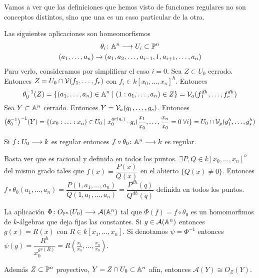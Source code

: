 \documentclass[ACGA.tex]{subfiles}
\begin{document}
\begin{prop}Vamos a ver que las definiciones que hemos visto de funciones regulares no son conceptos distintos, sino que una es un caso particular de la otra.
\end{prop}
\begin{dem}
\begin{lemma}
 Las siguientes aplicaciones son homeomorfismos
\begin{gather*} 
\theta_i \colon{\mathbb{A}^n}\longrightarrow{U_i\subset \mathbb{P}^n}\\
(a_1,\dotsc,a_n) \rightarrow (a_1,a_2,\dotsc,a_{i-1},1,a_{i+1},\dotsc,a_n)
\end{gather*}
Para verlo, consideramos por simplificar el caso $i=0$. Sea $Z\subset U_0$ cerrado. Entonces $Z=U_0\cap \mathcal{V}(f_1,\dotsc,f_r)$ con $f_i \in k[x_0,\dotsc,x_n]^h$. Entonces
$$
\theta_0^{-1}(Z) = \{(a_1,\dotsc,a_n)\in\mathbb{A}^n \mid (1:a_1,\dotsc,a_n)\in Z\} = \mathcal{V}_{a}(f_1^{dh},\dotsc,f_r^{dh})
$$
Sea $Y\subset \mathbb{A}^n$ cerrado. Entonces $Y=\mathcal{V}_{a}(g_1,\dotsc,g_s)$. Entonces
$$
{\left(\theta_0^{-1}\right)}^{-1}(Y) = \{(x_0:\dotsc:x_n)\in U_0 \mid x_0^{gr(g_i)}\cdot g_i(\frac{x_1}{x_0},\dotsc,\frac{x_n}{x_0}=0\;\forall i\} = U_0 \cap \mathcal{V}_{p}(g_1^h,\dotsc,g_s^h)
$$
\end{lemma}
\begin{lemma}Si $f\colon{U_0}\longrightarrow{k}$ es regular entonces $f \circ \theta_0\colon{\mathbb{A}^n}\longrightarrow{k}$ es regular. 

Basta ver que es racional y definida en todos los puntos. $\exists P,Q\in k[x_0,\dotsc,x_n]^h$ del mismo grado tales que $f(x)=\dfrac{P(x)}{Q(x)}$ en el abierto $\{Q(x)\neq 0\}$. Entonces $f\circ \theta_0 (a_1,\dotsc,a_n)= \dfrac{P(1,a_1,\dotsc,a_n)}{Q(1,a_1,\dotsc,a_n)} = \dfrac{P^{dh}(q)}{Q^{dh}(q)}$ definida en todos los puntos. 
\end{lemma}
La aplicación $\Phi \colon{ O_{\mathbb{P}^n}(U_0)}\longrightarrow{\mathcal{A}(\mathbb{A}^n)}$ tal que $\Phi(f) = f\circ \theta_0$ es un homomorfimos de $k$-álgebras que deja fijas las constantes. Si $g\in\mathcal{A}(\mathbb{A}^n)$ entonces $g(x)=R(x)$ con $R\in k[x_1,\dotsc,x_n]$. Si denotamos $\psi = \Phi^{-1}$ entonces $\psi(g) = \dfrac{R^h}{x_0^{gr(R)}}=R(\frac{x_1}{x_0},\dotsc,\frac{x_n}{x_0})$.

Además $Z\subset \mathbb{P}^n$ proyectivo, $Y=Z\cap U_0 \subset \mathbb{A}^n$ afín, entonces $\mathcal{A}(Y)\cong O_Z(Y)$.
\end{dem}
\end{document}
